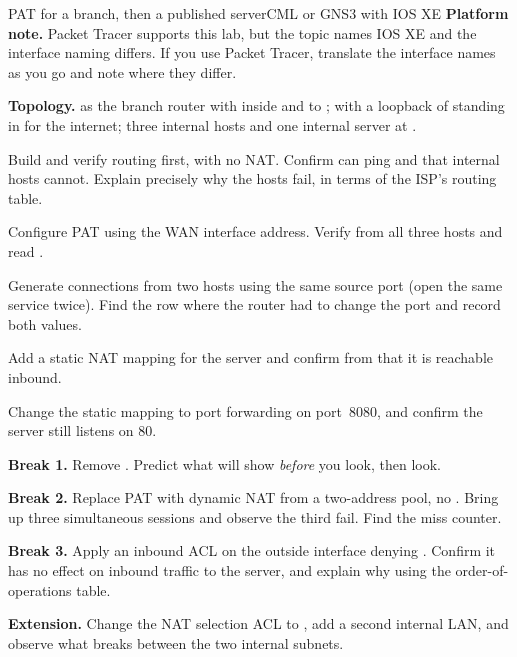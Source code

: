 \begin{lab}{PAT for a branch, then a published server}{CML or GNS3 with IOS XE}
\textbf{Platform note.} Packet Tracer supports this lab, but the topic names IOS
XE and the interface naming differs. If you use Packet Tracer, translate the
interface names as you go and note where they differ.

\textbf{Topology.}  as the branch router with 
inside and  to ;  with a loopback of
 standing in for the internet; three internal hosts and one
internal server at .

\begin{tasks}
  \item Build and verify routing first, with no NAT. Confirm  can ping
         and that internal hosts cannot. Explain precisely why
        the hosts fail, in terms of the ISP's routing table.
  \item Configure PAT using the WAN interface address. Verify from all three
        hosts and read .
  \item Generate connections from two hosts using the same source port
        (open the same service twice). Find the row where the router had to
        change the port and record both values.
  \item Add a static NAT mapping for the server and confirm from  that
        it is reachable inbound.
  \item Change the static mapping to port forwarding on port~8080, and confirm
        the server still listens on 80.
  \item \textbf{Break 1.} Remove . Predict what
         will show \emph{before} you look, then look.
  \item \textbf{Break 2.} Replace PAT with dynamic NAT from a two-address pool,
        no . Bring up three simultaneous sessions and observe the
        third fail. Find the miss counter.
  \item \textbf{Break 3.} Apply an inbound ACL on the outside interface denying
        . Confirm it has no effect on inbound traffic to the
        server, and explain why using the order-of-operations table.
  \item \textbf{Extension.} Change the NAT selection ACL to
        , add a second internal LAN, and observe what
        breaks between the two internal subnets.
\end{tasks}
\end{lab}

